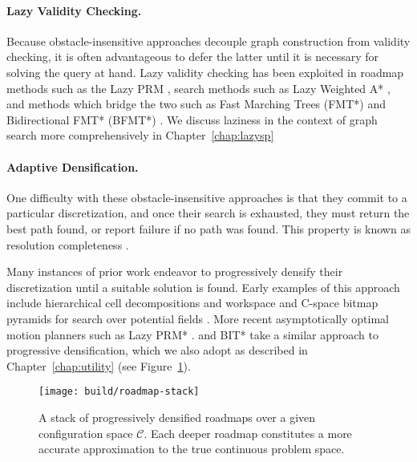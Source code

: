\paragraph{Lazy Validity Checking.}
Because obstacle-insensitive approaches decouple graph construction
from validity checking,
it is often advantageous to defer the latter until it is
necessary for solving the query at hand.
Lazy validity checking has been exploited
in roadmap methods such as the Lazy PRM
\citep{bohlin2000lazyprm, hauser2015lazy},
search methods such as Lazy Weighted A* \citep{cohen2014narms},
and methods which bridge the two
such as Fast Marching Trees (FMT*) \citep{janson2015fmtstar}
and Bidirectional FMT* (BFMT*) \citep{starek2015bfmtstar}.
We discuss laziness in the context of graph search
more comprehensively in Chapter~\ref{chap:lazysp}

\paragraph{Adaptive Densification.}
One difficulty with these obstacle-insensitive approaches
is that they commit to a particular discretization,
and once their search is exhausted,
they must return the best path found,
or report failure if no path was found.
This property is known as resolution completeness
\citep{cheng2004rescomplete}.

Many instances of prior work endeavor to progressively
densify their discretization until a suitable solution is found.
Early examples of this approach include
hierarchical cell decompositions \citep{faverjon1984octree}
and workspace and C-space bitmap pyramids for search over potential fields
\citep{barraquand1991distributedrepresentation}.
More recent asymptotically optimal motion planners such as
Lazy PRM* \citep{hauser2015lazy}.
and BIT* \citep{gammell2015bitstar} take a similar approach
to progressive densification,
which we also adopt as described in Chapter~\ref{chap:utility}
(see Figure~\ref{fig:roadmaps:roadmap-stack}).

\begin{figure}
   \centering
   \texttt{[image: build/roadmap-stack]}
   \caption{A stack of progressively densified roadmaps
      over a given configuration space $\mathcal{C}$.
      Each deeper roadmap constitutes a more accurate approximation
      to the true continuous problem space.}
   \label{fig:roadmaps:roadmap-stack}
\end{figure}

